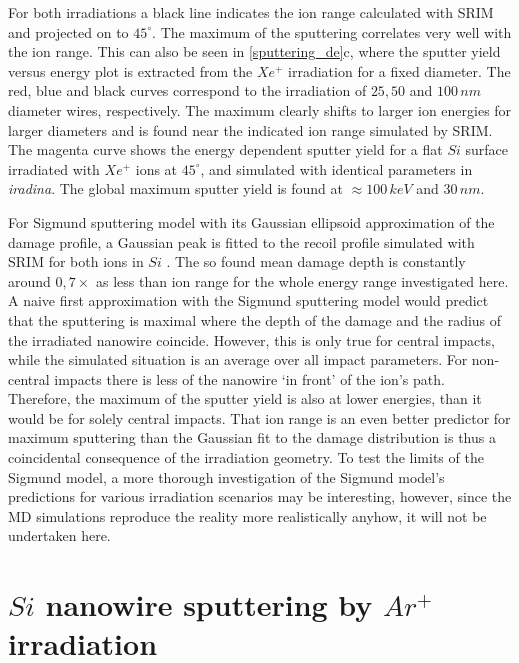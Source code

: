 For both irradiations a black line indicates the ion range calculated with SRIM and projected on to $45^\circ$. The maximum of the sputtering correlates very well with the ion range. This can also be seen in \ref{sputtering_de}c, where the sputter yield versus energy plot is extracted from the $Xe^+$ irradiation for a fixed diameter. The red, blue and black curves correspond to the irradiation of $25, 50$ and $100\,nm$ diameter wires, respectively. The maximum clearly shifts to larger ion energies for larger diameters and is found near the indicated ion range simulated by SRIM. The magenta curve shows the energy dependent sputter yield for a flat $Si$ surface irradiated with $Xe^+$ ions at $45^\circ$, and simulated with identical parameters in \emph{iradina}. The global maximum sputter yield is found at $\approx 100 \,keV$ and $30\,nm$. 

For Sigmund sputtering model with its Gaussian ellipsoid approximation of the damage profile, a Gaussian peak is fitted to the recoil profile simulated with SRIM for both ions in $Si$ \cite{bobes_ion_2012}. The so found mean damage depth is constantly around $0,7\times$ as less than ion range for the whole energy range investigated here. A naive first approximation with the Sigmund sputtering model would predict that the sputtering is maximal where the depth of the damage and the radius of the irradiated nanowire coincide. However, this is only true for central impacts, while the simulated situation is an average over all impact parameters. For non-central impacts there is less of the nanowire `in front' of the ion's path. Therefore, the maximum of the sputter yield is also at lower energies, than it would be for solely central impacts. That ion range is an even better predictor for maximum sputtering than the Gaussian fit to the damage distribution is thus a coincidental consequence of the irradiation geometry. To test the limits of the Sigmund model, a more thorough investigation of the Sigmund model's predictions for various irradiation scenarios may be interesting, however, since the MD simulations reproduce the reality more realistically anyhow, it will not be undertaken here.


\section{$Si$ nanowire sputtering by $Ar^+$ irradiation}
\label{sec:sisputtering}

